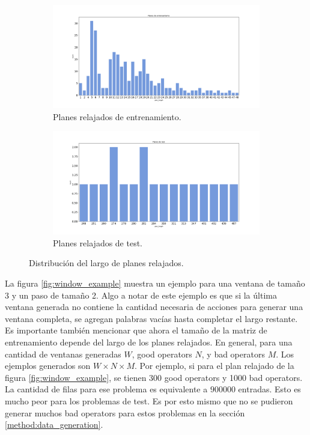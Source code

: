 \begin{figure}[t!]
    \begin{subfigure}[b]{\textwidth}
        \centering
        \includegraphics[width=\linewidth]{figures/plan_length_distplot_train.png}
        \caption{Planes relajados de entrenamiento.}
        \label{fig:plan-length-distplot-train}
    \end{subfigure}
    \begin{subfigure}[b]{\textwidth}
        \centering
        \includegraphics[width=\linewidth]{figures/plan_length_distplot_test.png}
        \caption{Planes relajados de test.}
        \label{fig:plan-length-distplot-test}
    \end{subfigure}
    \caption{Distribución del largo de planes relajados.}
    \label{fig:plan-length-distplot}
\end{figure}

La figura \ref{fig:window_example} muestra un ejemplo para una ventana de tamaño
3 y un paso de tamaño 2. Algo a notar de este ejemplo es que si la última
ventana generada no contiene la cantidad necesaria de acciones para generar una
ventana completa, se agregan palabras vacías hasta completar el largo restante.
Es importante también mencionar que ahora el tamaño de la matriz de entrenamiento
depende del largo de los planes relajados. En general, para una cantidad de
ventanas generadas $W$, good operators $N$, y bad operators $M$. Los ejemplos
generados son $W \times N \times M$. Por ejemplo, si para el plan relajado de la
figura \ref{fig:window_example}, se tienen 300 good operators y 1000 bad
operators. La cantidad de filas para ese problema es equivalente a $900000$
entradas. Esto es mucho peor para los problemas de test. Es por esto mismo que
no se pudieron generar muchos bad operators para estos problemas en la sección
\ref{method:data_generation}.

